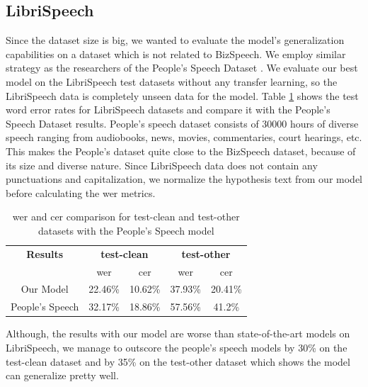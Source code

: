 \subsection{LibriSpeech}
Since the dataset size is big, we wanted to evaluate the model's generalization capabilities on  a dataset which is not related to BizSpeech. We employ similar strategy as the researchers of the People's Speech Dataset \cite{Galvez2021TheUsage}. We evaluate our best model on the LibriSpeech\cite{Panayotov2015Librispeech:Books} test datasets without any transfer learning, so the LibriSpeech data is completely unseen data for the model. Table \ref{table:libri} shows the test word error rates for LibriSpeech datasets and compare it with the People's Speech Dataset results. People's speech dataset consists of 30000 hours of diverse speech ranging from audiobooks, news, movies, commentaries, court hearings, etc. This makes the People's dataset quite close to the BizSpeech dataset, because of its size and diverse nature. Since LibriSpeech data does not contain any punctuations and capitalization, we normalize the hypothesis text from our model before calculating the \acrshort{wer} metrics. 

\begin{table}[ht]
\centering
\begin{tabular}{c | c c | c c }
\hline
\textbf{Results} & \multicolumn{2}{c|}{\textbf{test-clean}} & \multicolumn{2}{c}{\textbf{test-other}}\\\cline{2-5}
    & \acrshort{wer} & \acrshort{cer} & \acrshort{wer} & \acrshort{cer}\\
 \hline
  Our Model & 22.46\% & 10.62\% & 37.93\% & 20.41\%\\
  People's Speech \cite{Galvez2021TheUsage} & 32.17\% & 18.86\% & 57.56\% & 41.2\% \\
 \hline
\end{tabular}
\caption{\label{table:libri} \acrshort{wer} and \acrshort{cer} comparison for test-clean and test-other datasets with the People's Speech model}
\end{table}

Although, the results with our model are worse than state-of-the-art models on LibriSpeech, we manage to outscore the people's speech models by 30\% on the test-clean dataset and by 35\% on the test-other dataset which shows the model can generalize pretty well.
 
